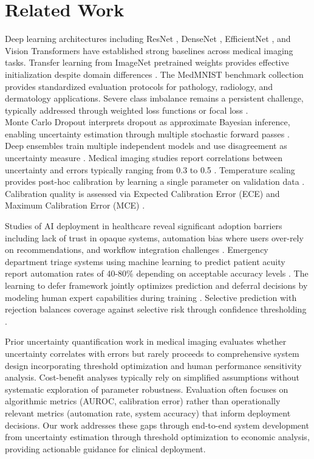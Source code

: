 \documentclass[10pt,a4paper]{article}
\begin{document}
\section{Related Work}

Deep learning architectures including ResNet \cite{he2016deep}, DenseNet \cite{huang2017densely}, EfficientNet \cite{tan2019efficientnet}, and Vision Transformers \cite{dosovitskiy2020image} have established strong baselines across medical imaging tasks. Transfer learning from ImageNet pretrained weights provides effective initialization despite domain differences \cite{raghu2019transfusion}. The MedMNIST benchmark collection \cite{yang2021medmnist} provides standardized evaluation protocols for pathology, radiology, and dermatology applications. Severe class imbalance remains a persistent challenge, typically addressed through weighted loss functions or focal loss \cite{buda2018systematic}.\\

Monte Carlo Dropout interprets dropout as approximate Bayesian inference, enabling uncertainty estimation through multiple stochastic forward passes \cite{gal2016dropout}. Deep ensembles train multiple independent models and use disagreement as uncertainty measure \cite{lakshminarayanan2017simple}. Medical imaging studies report correlations between uncertainty and errors typically ranging from 0.3 to 0.5 \cite{leibig2017leveraging}. Temperature scaling provides post-hoc calibration by learning a single parameter on validation data \cite{guo2017calibration}. Calibration quality is assessed via Expected Calibration Error (ECE) and Maximum Calibration Error (MCE) \cite{kumar2019verified}.

Studies of AI deployment in healthcare reveal significant adoption barriers including lack of trust in opaque systems, automation bias where users over-rely on recommendations, and workflow integration challenges \cite{sendak2020human}. Emergency department triage systems using machine learning to predict patient acuity report automation rates of 40-80\% depending on acceptable accuracy levels \cite{fernandes2024use}. The learning to defer framework jointly optimizes prediction and deferral decisions by modeling human expert capabilities during training \cite{mozannar2020consistent}. Selective prediction with rejection balances coverage against selective risk through confidence thresholding \cite{geifman2017selective}.

Prior uncertainty quantification work in medical imaging evaluates whether uncertainty correlates with errors but rarely proceeds to comprehensive system design incorporating threshold optimization and human performance sensitivity analysis. Cost-benefit analyses typically rely on simplified assumptions without systematic exploration of parameter robustness. Evaluation often focuses on algorithmic metrics (AUROC, calibration error) rather than operationally relevant metrics (automation rate, system accuracy) that inform deployment decisions. Our work addresses these gaps through end-to-end system development from uncertainty estimation through threshold optimization to economic analysis, providing actionable guidance for clinical deployment.
\end{document}
